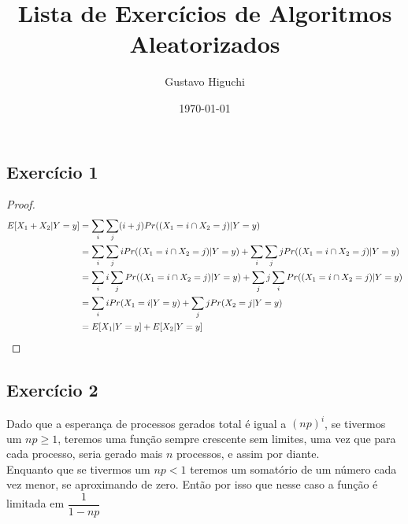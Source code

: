 \documentclass{article}
\title{Lista de Exercícios de Algoritmos Aleatorizados}
\author{Gustavo Higuchi}
\date{\today}
\begin{document}
\maketitle

\tableofcontents
\newpage


\chapter{}
\section{Exercício 1}
\begin{proof}
	\begin{equation}
	\notag
		\begin{split}
			E[X_1 + X_2 | Y = y] &= \sum\limits_{i}\sum\limits_{j}(i+j) Pr((X_1 = i \cap X_2 = j)| Y = y)\\
			&= \sum\limits_{i}\sum\limits_{j}i Pr((X_1 = i \cap X_2 = j)| Y = y) + \sum\limits_{i}\sum\limits_{j}j Pr((X_1 = i \cap X_2 = j)| Y = y)\\
			&= \sum\limits_{i} i \sum\limits_{j}Pr((X_1 = i \cap X_2 = j)| Y = y) + \sum\limits_{j} j \sum\limits_{i}Pr((X_1 = i \cap X_2 = j)| Y = y)\\
			&= \sum\limits_{i}i Pr(X_1 = i | Y = y) + \sum\limits_{j}j Pr(X_2 = j| Y = y)\\
			&= E[X_1 | Y = y] + E[X_2 | Y = y]
		\end{split}
	\end{equation}
\end{proof}

\section{Exercício 2}
Dado que a esperança de processos gerados total é igual a $(np)^i$, se tivermos
um $np \geq 1$, teremos uma função sempre crescente sem limites, uma vez que para
cada processo, seria gerado mais $n$ processos, e assim por diante.\\

Enquanto que se tivermos um $np < 1$ teremos um somatório de um número cada vez
menor, se aproximando de zero. Então por isso que nesse caso a função é limitada 
em $\dfrac{1}{1-np}$ 
\end{document}
